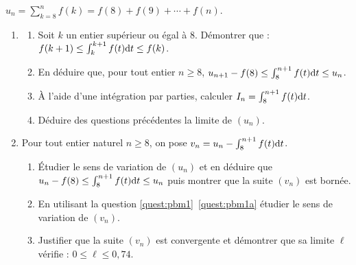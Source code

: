 \begin{exo}
\begin{description}
            $u_n = \sum_{k=8}^n f(k) = f(8) + f(9) + \cdots + f(n)$.
            \begin{enumerate}
                  \item \label{quest:pbm1}
                         \begin{enumerate}
                              \item Soit $k$ un entier sup\'erieur ou \'egal \`a $8$. \label{quest:pbm1a}
                                    D\'emontrer que : $f(k+1) \leq \int_{k}^{k+1} f(t) \mathrm{d}t \leq f(k)$.
                              \item En d\'eduire que, pour tout entier $n \geq 8$, 
                                    $u_{n+1} - f(8) \leq \int_{8}^{n+1} f(t) \mathrm{d}t \leq u_n$.
                              \item \`A l'aide d'une int\'egration par parties, calculer $I_n = \int_{8}^{n+1} f(t) \mathrm{d}t$.
                              \item D\'eduire des questions pr\'ec\'edentes la limite de $(u_n)$.
                        \end{enumerate}
                  \item Pour tout entier naturel $n \geq 8$, on pose 
                        $v_n = u_n - \int_{8}^{n+1} f(t) \mathrm{d}t$.
                        \begin{enumerate}
                              \item \'Etudier le sens de variation de $(u_n)$ et en d\'eduire que 
                                    $u_n - f(8) \leq \int_{8}^{n+1} f(t) \mathrm{d}t \leq u_n$
                                    puis montrer que la suite $(v_n)$ est born\'ee.
                              \item En utilisant la question \ref{quest:pbm1}~\ref{quest:pbm1a} 
                                    \'etudier le sens de variation de $(v_n)$.
                              \item Justifier que la suite $(v_n)$ est convergente et d\'emontrer que sa limite
                                    $\ell$ v\'erifie : $0 \leq \ell \leq 0,74$.
                        \end{enumerate}
            \end{enumerate}
      \end{description}
\end{exo}
%
